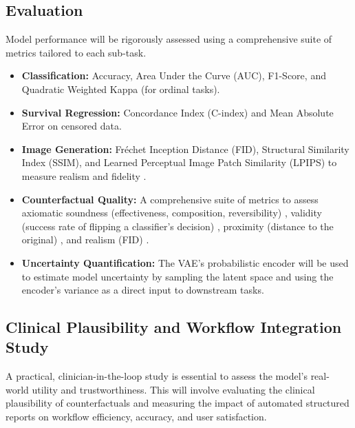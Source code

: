 \documentclass[11pt, a4paper]{article}
\begin{document}
\subsection{Evaluation}
Model performance will be rigorously assessed using a comprehensive suite of metrics tailored to each sub-task.
\begin{itemize}
    \item \textbf{Classification:} Accuracy, Area Under the Curve (AUC), F1-Score, and Quadratic Weighted Kappa (for ordinal tasks).
    \item \textbf{Survival Regression:} Concordance Index (C-index) and Mean Absolute Error on censored data.
    \item \textbf{Image Generation:} Fréchet Inception Distance (FID), Structural Similarity Index (SSIM), and Learned Perceptual Image Patch Similarity (LPIPS) to measure realism and fidelity \cite{VigneshwaranOhara2024, Singla2022, LiShi2023, MoroSantinha2024, RossiLopez2024}.
    \item \textbf{Counterfactual Quality:} A comprehensive suite of metrics to assess axiomatic soundness (effectiveness, composition, reversibility) \cite{KomanduriWu2023, MonteiroRibeiro2023}, validity (success rate of flipping a classifier’s decision) \cite{SinglaEslami2021, Singla2022}, proximity (distance to the original) \cite{GuoDeng2024}, and realism (FID) \cite{VigneshwaranOhara2024, Singla2022}.
    \item \textbf{Uncertainty Quantification:} The VAE's probabilistic encoder will be used to estimate model uncertainty by sampling the latent space and using the encoder's variance as a direct input to downstream tasks.
\end{itemize}

\subsection{Clinical Plausibility and Workflow Integration Study}
A practical, clinician-in-the-loop study is essential to assess the model's real-world utility and trustworthiness. This will involve evaluating the clinical plausibility of counterfactuals and measuring the impact of automated structured reports on workflow efficiency, accuracy, and user satisfaction.
\end{document}
